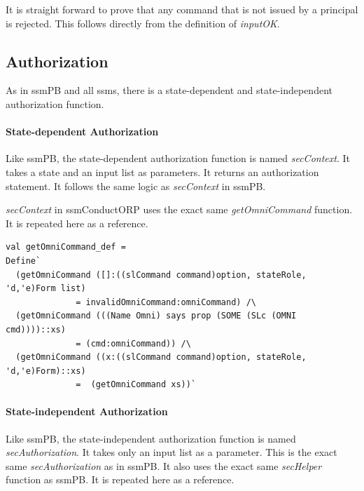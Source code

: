 \documentclass[../../main/main.tex]{subfiles}
\begin{document}
It is straight forward to prove that any command that is not issued by a principal is rejected.  This follows directly from the definition of \textit{inputOK}.

\HOLssmConductORPTheoremsinputOKXXcmdXXrejectXXlemma


\subsection{Authorization}
As in ssmPB and all \glspl{ssm}, there is a state-dependent and state-independent authorization function.

\paragraph*{State-dependent Authorization}
Like ssmPB, the state-dependent authorization function is named \textit{secContext}.  It takes a state and an input list as parameters.  It returns an authorization statement.  It follows the same logic as \textit{secContext} in ssmPB.

\HOLConductORPDefDefinitionssecContextXXdef

\textit{secContext} in ssmConductORP uses the exact same \textit{getOmniCommand} function. It is repeated here as a reference.



\begin{lstlisting}
val getOmniCommand_def =
Define`
  (getOmniCommand ([]:((slCommand command)option, stateRole, 'd,'e)Form list)
  		      = invalidOmniCommand:omniCommand) /\
  (getOmniCommand (((Name Omni) says prop (SOME (SLc (OMNI cmd))))::xs)
  		      = (cmd:omniCommand)) /\
  (getOmniCommand ((x:((slCommand command)option, stateRole, 'd,'e)Form)::xs)
  		      =  (getOmniCommand xs))`
\end{lstlisting}

\paragraph*{State-independent Authorization}
Like ssmPB, the state-independent authorization function is named \textit{secAuthorization}.  It takes only an input list as a parameter.  This is the exact same \textit{secAuthorization} as in ssmPB. It also uses the exact same \textit{secHelper} function as ssmPB.  It is repeated here as a reference.
 

\HOLConductORPDefDefinitionssecAuthorizationXXdef
\end{document}
